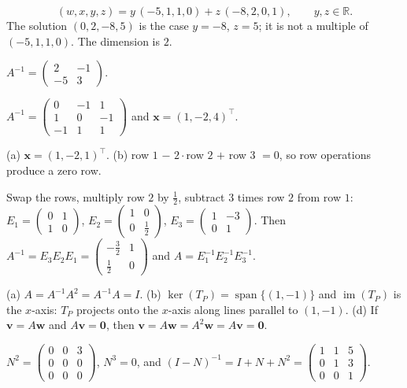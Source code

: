 \documentclass[11pt]{article}
\DeclareMathOperator{\im}{im}
\DeclareMathOperator{\Span}{span}
\begin{document}
\begin{description}[leftmargin=0pt, itemsep=0.3em]
    \[(w, x, y, z) = y\,(-5, 1, 1, 0) + z\,(-8, 2, 0, 1), \qquad y, z \in \mathbb{R}.\]
    The solution $(0, 2, -8, 5)$ is the case $y = -8$, $z = 5$; it is not a multiple of $(-5, 1, 1, 0)$. The dimension is $2$.
    \item[\ref{pr:inverse2}.] $A^{-1} = \begin{pmatrix} 2 & -1 \\ -5 & 3 \end{pmatrix}$.
    \item[\ref{pr:inverse3}.] $A^{-1} = \begin{pmatrix} 0 & -1 & 1 \\ 1 & 0 & -1 \\ -1 & 1 & 1 \end{pmatrix}$ and $\mathbf{x} = (1, -2, 4)^\top$.
    \item[\ref{pr:arithmetic}.] (a) $\mathbf{x} = (1, -2, 1)^\top$. (b) row $1$ $-$ $2\cdot$row $2$ $+$ row $3$ $= 0$, so row operations produce a zero row.
    \item[\ref{pr:elementary}.] Swap the rows, multiply row $2$ by $\frac{1}{2}$, subtract $3$ times row $2$ from row $1$: $E_1 = \begin{pmatrix} 0 & 1 \\ 1 & 0 \end{pmatrix}$, $E_2 = \begin{pmatrix} 1 & 0 \\ 0 & \frac{1}{2} \end{pmatrix}$, $E_3 = \begin{pmatrix} 1 & -3 \\ 0 & 1 \end{pmatrix}$. Then $A^{-1} = E_3 E_2 E_1 = \begin{pmatrix} -\frac{3}{2} & 1 \\ \frac{1}{2} & 0 \end{pmatrix}$ and $A = E_1^{-1} E_2^{-1} E_3^{-1}$.
    \item[\ref{pr:idempotent}.] (a) $A = A^{-1}A^2 = A^{-1}A = I$. (b) $\ker(T_P) = \Span\{(1, -1)\}$ and $\im(T_P)$ is the $x$-axis: $T_P$ projects onto the $x$-axis along lines parallel to $(1, -1)$. (d) If $\mathbf{v} = A\mathbf{w}$ and $A\mathbf{v} = \mathbf{0}$, then $\mathbf{v} = A\mathbf{w} = A^2 \mathbf{w} = A\mathbf{v} = \mathbf{0}$.
    \item[\ref{pr:nilpotent}.] $N^2 = \begin{pmatrix} 0 & 0 & 3 \\ 0 & 0 & 0 \\ 0 & 0 & 0 \end{pmatrix}$, $N^3 = 0$, and $(I - N)^{-1} = I + N + N^2 = \begin{pmatrix} 1 & 1 & 5 \\ 0 & 1 & 3 \\ 0 & 0 & 1 \end{pmatrix}$.

\end{description}
\end{document}
